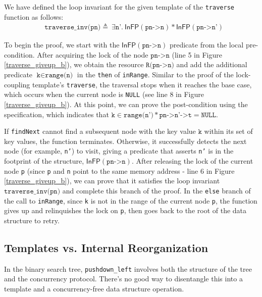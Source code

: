 \documentclass[a4paper,UKenglish,cleveref, autoref, thm-restate]{lipics-v2021}
\newcommand{\infp}{\ensuremath{\mathsf{InFP}}}
\begin{document}
We have defined the loop invariant for the given template of the \texttt{traverse} function as follows: 
\begin{align*} &\texttt{traverse\_inv(pn)} \triangleq\ \exists \texttt{n'}.\ \infp (\texttt{pn->n}) \ast \infp (\texttt{pn->n'})   
\end{align*}

To begin the proof, we start with the $\infp (\texttt{pn->n})$ predicate from the local pre-condition. After acquiring the lock of the node $\texttt{pn->n}$ (line 5 in Figure \ref{traverse_giveup_b}), we obtain the resource $\texttt{R(pn->n)}$ and add the additional predicate $\texttt{k} \in \texttt{range(n)}$ in the \texttt{then} of \texttt{inRange}. Similar to the proof of the lock-coupling template's \texttt{traverse}, the traversal stops when it reaches the base case, which occurs when the current node is \lstinline{NULL} (see line 8 in Figure \ref{traverse_giveup_b}). At this point, we can prove the post-condition using the specification, which indicates that $\texttt{k} \in \texttt{range(n')} \ast \texttt{pn->n'->t} = \texttt{NULL}$.

If \lstinline{findNext} cannot find a subsequent node with the key value $\texttt{k}$ within its set of key values, the function terminates. Otherwise, it successfully detects the next node (for example, \texttt{n'}) to visit, giving a predicate that asserts \texttt{n'} is in the footprint of the structure, $\infp(\texttt{pn->n})$. After releasing the lock of the current node \texttt{p} (since \texttt{p} and \texttt{n} point to the same memory address - line 6 in Figure \ref{traverse_giveup_b}), we can prove that it satisfies the loop invariant $\texttt{traverse\_inv(pn)}$ and complete this branch of the proof. In the \texttt{else} branch of the call to \texttt{inRange}, since \texttt{k} is not in the range of the current node \texttt{p}, the function gives up and relinquishes the lock on \texttt{p}, then goes back to the root of the data structure to retry.



\subsection{Templates vs. Internal Reorganization} %
In the binary search tree, \texttt{pushdown\_left} involves both the structure of the tree and the concurrency protocol. There's no good way to disentangle this into a template and a concurrency-free data structure operation.
\end{document}
